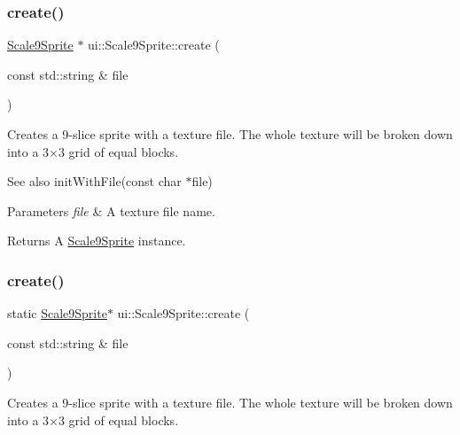 \subsubsection{\texorpdfstring{create()}{create()}\hspace{0.1cm}{\footnotesize\ttfamily [9/10]}}
{\footnotesize\ttfamily \hyperlink{classui_1_1Scale9Sprite}{Scale9\+Sprite} $\ast$ ui\+::\+Scale9\+Sprite\+::create (\begin{DoxyParamCaption}\item[{const std\+::string \&}]{file }\end{DoxyParamCaption})\hspace{0.3cm}{\ttfamily [static]}}

Creates a 9-\/slice sprite with a texture file. The whole texture will be broken down into a 3×3 grid of equal blocks.

\begin{DoxySeeAlso}{See also}
init\+With\+File(const char $\ast$file) 
\end{DoxySeeAlso}

\begin{DoxyParams}{Parameters}
{\em file} & A texture file name. \\
\hline
\end{DoxyParams}
\begin{DoxyReturn}{Returns}
A \hyperlink{classui_1_1Scale9Sprite}{Scale9\+Sprite} instance. 
\end{DoxyReturn}
\mbox{\label{classui_1_1Scale9Sprite_a981e5f6658862ff6d0d6032a5eaba2e6}} 
\subsubsection{\texorpdfstring{create()}{create()}\hspace{0.1cm}{\footnotesize\ttfamily [10/10]}}
{\footnotesize\ttfamily static \hyperlink{classui_1_1Scale9Sprite}{Scale9\+Sprite}$\ast$ ui\+::\+Scale9\+Sprite\+::create (\begin{DoxyParamCaption}\item[{const std\+::string \&}]{file }\end{DoxyParamCaption})\hspace{0.3cm}{\ttfamily [static]}}

Creates a 9-\/slice sprite with a texture file. The whole texture will be broken down into a 3×3 grid of equal blocks.

